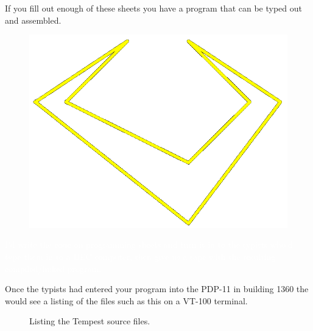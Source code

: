 If you fill out enough of these sheets you have a program that can be typed out and assembled. 
\begin{definition}
\setlength{\intextsep}{0pt}%
\setlength{\columnsep}{3pt}%
\begin{figure}
\includegraphics[width=\linewidth]{src/callout/claw_t.png} 
\end{figure}
\small
\textcolor{white}{
I’d write the code on programming sheets and turn it in to the typists
who’d type them in to a DEC computer, then give us a tape with the resulting
compiled/linked program.
}
\end{definition}

Once the typists had entered your program into the PDP-11 in building 1360 the would see a listing
of the files such as this on a VT-100 terminal.
\begin{figure}[H]
			\centering
		\caption{Listing the Tempest source files.}
\end{figure}

